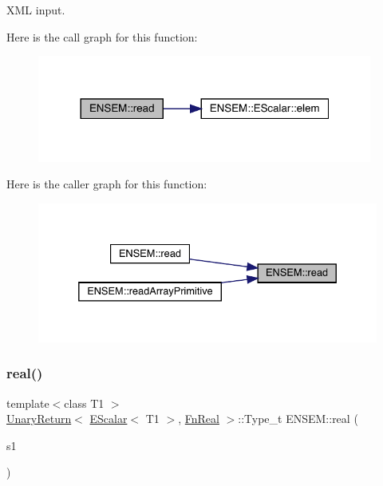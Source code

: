 X\+ML input. 

Here is the call graph for this function\+:
\nopagebreak
\begin{figure}[H]
\begin{center}
\leavevmode
\includegraphics[width=312pt]{d4/dca/group__escalar_ga5631206e233cf75b5fb2ff13ee8b77ac_cgraph}
\end{center}
\end{figure}
Here is the caller graph for this function\+:
\nopagebreak
\begin{figure}[H]
\begin{center}
\leavevmode
\includegraphics[width=332pt]{d4/dca/group__escalar_ga5631206e233cf75b5fb2ff13ee8b77ac_icgraph}
\end{center}
\end{figure}
\mbox{\label{group__escalar_gae1f319d978abc1631bd68382787544aa}} 
\subsubsection{\texorpdfstring{real()}{real()}}
{\footnotesize\ttfamily template$<$class T1 $>$ \\
\mbox{\hyperlink{structENSEM_1_1UnaryReturn}{Unary\+Return}}$<$ \mbox{\hyperlink{classENSEM_1_1EScalar}{E\+Scalar}}$<$ T1 $>$, \mbox{\hyperlink{structENSEM_1_1FnReal}{Fn\+Real}} $>$\+::Type\+\_\+t E\+N\+S\+E\+M\+::real (\begin{DoxyParamCaption}\item[{const \mbox{\hyperlink{classENSEM_1_1EScalar}{E\+Scalar}}$<$ T1 $>$ \&}]{s1 }\end{DoxyParamCaption})\hspace{0.3cm}{\ttfamily [inline]}}

